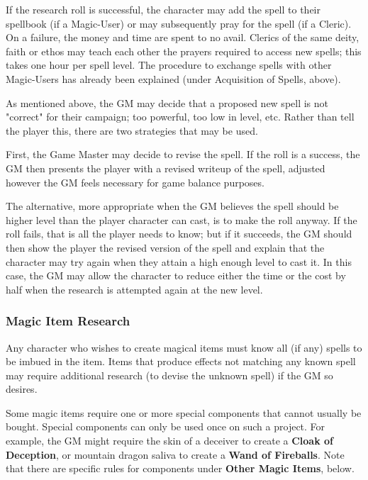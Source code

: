 \documentclass[a4paper,twoside,openany,10pt]{book}
\begin{document}
\begin{multicols}{2}
If the research roll is successful, the character may add the spell to their spellbook (if a Magic-User) or may subsequently pray for the spell (if a Cleric). On a failure, the money and time are spent to no avail. Clerics of the same deity, faith or ethos may teach each other the prayers required to access new spells; this takes one hour per spell level. The procedure to exchange spells with other Magic-Users has already been explained (under Acquisition of Spells, above).

As mentioned above, the GM may decide that a proposed new spell is not "correct" for their campaign; too powerful, too low in level, etc. Rather than tell the player this, there are two strategies that may be used.

First, the Game Master may decide to revise the spell. If the roll is a success, the GM then presents the player with a revised writeup of the spell, adjusted however the GM feels necessary for game balance purposes.

The alternative, more appropriate when the GM believes the spell should be higher level than the player character can cast, is to make the roll anyway. If the roll fails, that is all the player needs to know; but if it succeeds, the GM should then show the player the revised version of the spell and explain that the character may try again when they attain a high enough level to cast it. In this case, the GM may allow the character to reduce either the time or the cost by half when the research is attempted again at the new level.

\subsubsection{Magic Item Research}\label{magic-item-research}

Any character who wishes to create magical items must know all (if any) spells to be imbued in the item. Items that produce effects not matching any known spell may require additional research (to devise the unknown spell) if the GM so desires.

Some magic items require one or more special components that cannot usually be bought. Special components can only be used once on such a project. For example, the GM might require the skin of a deceiver to create a \textbf{Cloak of Deception}, or mountain dragon saliva to create a \textbf{Wand of Fireballs}. Note that there are specific rules for components under \textbf{Other Magic Items}, below.


\end{multicols}
\end{document}
